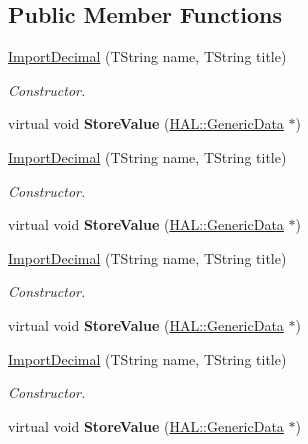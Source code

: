 \subsection*{Public Member Functions}
\begin{DoxyCompactItemize}
\item 
\hyperlink{class_h_a_l_1_1_algorithms_1_1_import_decimal_a15781bef55e9a3ff8de1ec1f64a94ff5}{Import\+Decimal} (T\+String name, T\+String title)
\begin{DoxyCompactList}\small\item\em Constructor. \end{DoxyCompactList}\item 
\hypertarget{class_h_a_l_1_1_algorithms_1_1_import_decimal_a3044dabc75bee09871d80f32333e730f}{virtual void {\bfseries Store\+Value} (\hyperlink{class_h_a_l_1_1_generic_data}{H\+A\+L\+::\+Generic\+Data} $\ast$)}\label{class_h_a_l_1_1_algorithms_1_1_import_decimal_a3044dabc75bee09871d80f32333e730f}

\item 
\hyperlink{class_h_a_l_1_1_algorithms_1_1_import_decimal_a15781bef55e9a3ff8de1ec1f64a94ff5}{Import\+Decimal} (T\+String name, T\+String title)
\begin{DoxyCompactList}\small\item\em Constructor. \end{DoxyCompactList}\item 
\hypertarget{class_h_a_l_1_1_algorithms_1_1_import_decimal_a3044dabc75bee09871d80f32333e730f}{virtual void {\bfseries Store\+Value} (\hyperlink{class_h_a_l_1_1_generic_data}{H\+A\+L\+::\+Generic\+Data} $\ast$)}\label{class_h_a_l_1_1_algorithms_1_1_import_decimal_a3044dabc75bee09871d80f32333e730f}

\item 
\hyperlink{class_h_a_l_1_1_algorithms_1_1_import_decimal_a15781bef55e9a3ff8de1ec1f64a94ff5}{Import\+Decimal} (T\+String name, T\+String title)
\begin{DoxyCompactList}\small\item\em Constructor. \end{DoxyCompactList}\item 
\hypertarget{class_h_a_l_1_1_algorithms_1_1_import_decimal_a3044dabc75bee09871d80f32333e730f}{virtual void {\bfseries Store\+Value} (\hyperlink{class_h_a_l_1_1_generic_data}{H\+A\+L\+::\+Generic\+Data} $\ast$)}\label{class_h_a_l_1_1_algorithms_1_1_import_decimal_a3044dabc75bee09871d80f32333e730f}

\item 
\hyperlink{class_h_a_l_1_1_algorithms_1_1_import_decimal_a15781bef55e9a3ff8de1ec1f64a94ff5}{Import\+Decimal} (T\+String name, T\+String title)
\begin{DoxyCompactList}\small\item\em Constructor. \end{DoxyCompactList}\item 
\hypertarget{class_h_a_l_1_1_algorithms_1_1_import_decimal_a3044dabc75bee09871d80f32333e730f}{virtual void {\bfseries Store\+Value} (\hyperlink{class_h_a_l_1_1_generic_data}{H\+A\+L\+::\+Generic\+Data} $\ast$)}\label{class_h_a_l_1_1_algorithms_1_1_import_decimal_a3044dabc75bee09871d80f32333e730f}


\end{DoxyCompactItemize}
